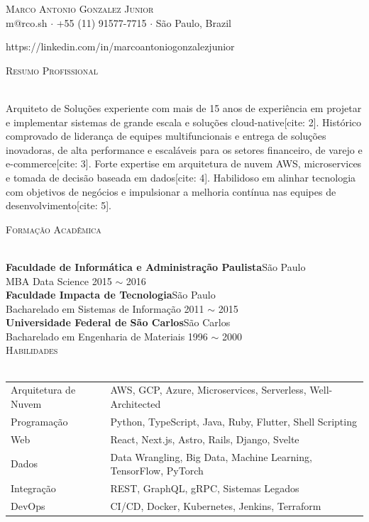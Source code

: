 \documentclass[a4paper]{article}
\newcommand{\lineunder} {
    \vspace*{-8pt} \\
    \hspace*{-18pt} \hrulefill \\
}
\newcommand{\header} [1] {
    \vspace{2mm}
    {\hspace*{-18pt}\vspace*{7pt} \textsc{#1}}
    \vspace*{-6pt} \lineunder
    \vspace{1mm}
}
\begin{document}
\vspace*{-40pt}

\vspace*{-10pt}
\begin{center}
    {\Huge \scshape {Marco Antonio Gonzalez Junior}}                \\
    \vspace{2.5pt}
    m@rco.sh $\cdot$ +55 (11) 91577-7715 $\cdot$ São Paulo, Brazil  \\
    \vspace{2.5pt}
    
https://linkedin.com/in/marcoantoniogonzalezjunior              \\
\end{center}

\header{Resumo Profissional}
Arquiteto de Soluções experiente com mais de 15 anos de experiência em projetar e implementar sistemas de grande escala e soluções cloud-native[cite: 2]. 
Histórico comprovado de liderança de equipes multifuncionais e entrega de soluções inovadoras, de alta performance e escaláveis para os setores financeiro, de varejo e e-commerce[cite: 3]. 
Forte expertise em arquitetura de nuvem AWS, microservices e tomada de decisão baseada em dados[cite: 4]. 
Habilidoso em alinhar tecnologia com objetivos de negócios e impulsionar a melhoria contínua nas equipes de desenvolvimento[cite: 5]. 
\header{Formação Acadêmica}
\textbf{Faculdade de Informática e Administração Paulista}\hfill São Paulo\\
MBA Data Science \hfill 2015 $\sim$ 2016\\
\vspace{1mm}
\textbf{Faculdade Impacta de Tecnologia}\hfill São Paulo\\
Bacharelado em Sistemas de Informação \hfill 2011 $\sim$ 2015\\
\vspace{1mm}
\textbf{Universidade Federal de São Carlos}\hfill São Carlos\\
Bacharelado em Engenharia de Materiais \hfill 1996 $\sim$ 2000\\


\header{Habilidades}
\vspace{1mm}
\begin{tabular}{ l l }
    Arquitetura de Nuvem & AWS, GCP, Azure, Microservices, Serverless, Well-Architected \\
    Programação & Python, TypeScript, Java, Ruby, Flutter, Shell Scripting \\
    Web & React, Next.js, Astro, Rails, Django, Svelte \\
    Dados & Data Wrangling, Big Data, Machine Learning, TensorFlow, PyTorch \\
    Integração 
& REST, GraphQL, gRPC, Sistemas Legados \\
    DevOps & CI/CD, Docker, Kubernetes, Jenkins, Terraform \\
\end{tabular}
\end{document}
